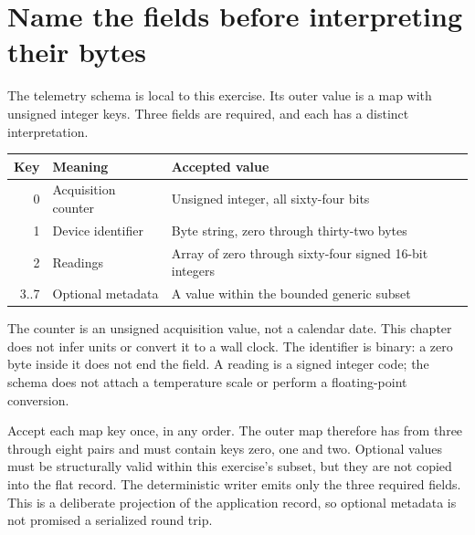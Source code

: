 \section{Name the fields before interpreting their bytes}
The telemetry schema is local to this exercise. Its outer value is a map with unsigned
integer keys. Three fields are required, and each has a distinct interpretation.

\begin{center}
  \begin{tabular}{rll}
    Key  & Meaning             & Accepted value                                          \\
    \hline
    0    & Acquisition counter & Unsigned integer, all sixty-four bits                   \\
    1    & Device identifier   & Byte string, zero through thirty-two bytes              \\
    2    & Readings            & Array of zero through sixty-four signed 16-bit integers \\
    3..7 & Optional metadata   & A value within the bounded generic subset               \\
  \end{tabular}
\end{center}

The counter is an unsigned acquisition value, not a calendar date. This chapter does
not infer units or convert it to a wall clock. The identifier is binary: a zero byte
inside it does not end the field. A reading is a signed integer code; the schema does
not attach a temperature scale or perform a floating-point conversion.

Accept each map key once, in any order. The outer map therefore has from three through
eight pairs and must contain keys zero, one and two. Optional values must be structurally
valid within this exercise's subset, but they are not copied into the flat record.
The deterministic writer emits only the three required fields. This is a deliberate
projection of the application record, so optional metadata is not promised a serialized
round trip.
